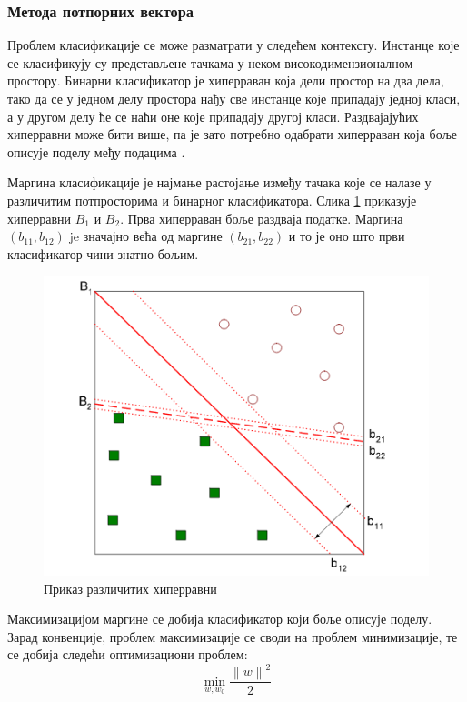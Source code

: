 \documentclass[a4paper]{article}
\newcommand{\norm}[1]{\left\lVert#1\right\rVert}
\begin{document}
{\subsubsection*{Метода потпорних вектора}
Проблем класификације се може разматрати у следећем контексту. Инстанце које се класификују су представљене тачкама у неком високодимензионалном простору. Бинарни класификатор је хиперраван која дели простор на два дела, тако да се у једном делу простора нађу све инстанце које припадају једној класи, а у другом делу ће се наћи оне које припадају другој класи. Раздвајајућих хиперравни може бити више, па је зато потребно одабрати хиперраван која боље описује поделу међу подацима \cite{svm-intro}.


Маргина класификације је најмање растојање између тачака које се налазе у различитим потпросторима и бинарног класификатора. Слика \ref{fig:svm} приказује хиперравни $B_1$ и $B_2$. Прва хиперраван боље раздваја податке. Маргина $(b_{11}, b_{12})$ je значајно већа од маргине $(b_{21}, b_{22})$ и то је оно што први класификатор чини знатно бољим.

\begin{figure}[h!]
\begin{center}
\includegraphics[scale=0.4]{./slike/svm.png}
\end{center}
\caption{Приказ различитих хиперравни}
\label{fig:svm}
\end{figure}

Максимизацијом маргине се добија класификатор који боље описује поделу. Зарад конвенције, проблем максимизације се своди на проблем минимизације, те се добија следећи оптимизациони проблем:
\begin{equation}
    \min_{w, w_0} \frac{ {\norm{w}}^2 }{2}
\end{equation}


}
\end{document}
